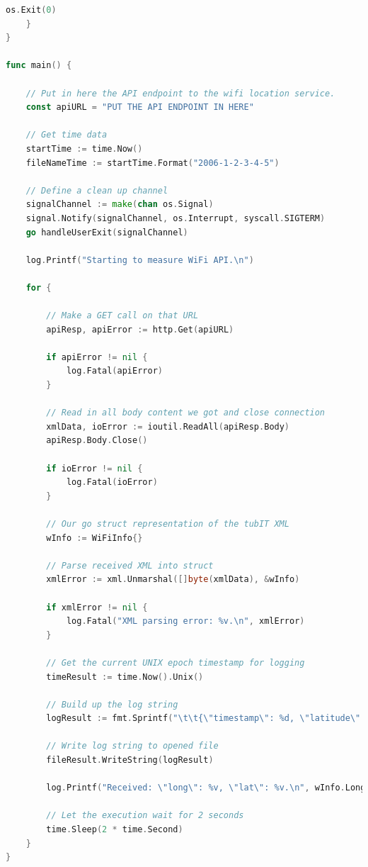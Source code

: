 \documentclass[twoside,11pt,titlepage,a4paper,english,bibliography=totocnumbered,listof=numbered]{scrbook}
\begin{document}
\begin{appendices}
\begin{lstlisting}[language=go]
        os.Exit(0)
    }
}

func main() {

    // Put in here the API endpoint to the wifi location service.
    const apiURL = "PUT THE API ENDPOINT IN HERE"

    // Get time data
    startTime := time.Now()
    fileNameTime := startTime.Format("2006-1-2-3-4-5")

    // Define a clean up channel
    signalChannel := make(chan os.Signal)
    signal.Notify(signalChannel, os.Interrupt, syscall.SIGTERM)
    go handleUserExit(signalChannel)

    log.Printf("Starting to measure WiFi API.\n")

    for {

        // Make a GET call on that URL
        apiResp, apiError := http.Get(apiURL)

        if apiError != nil {
            log.Fatal(apiError)
        }

        // Read in all body content we got and close connection
        xmlData, ioError := ioutil.ReadAll(apiResp.Body)
        apiResp.Body.Close()

        if ioError != nil {
            log.Fatal(ioError)
        }

        // Our go struct representation of the tubIT XML
        wInfo := WiFiInfo{}

        // Parse received XML into struct
        xmlError := xml.Unmarshal([]byte(xmlData), &wInfo)

        if xmlError != nil {
            log.Fatal("XML parsing error: %v.\n", xmlError)
        }

        // Get the current UNIX epoch timestamp for logging
        timeResult := time.Now().Unix()

        // Build up the log string
        logResult := fmt.Sprintf("\t\t{\"timestamp\": %d, \"latitude\": \"%.15f\", \"longitude\": \"%.15f\", \"building\": \"%s\", \"floor\": \"%s\"},\n", timeResult, wInfo.Latitude, wInfo.Longitude, wInfo.Building, wInfo.Floor)

        // Write log string to opened file
        fileResult.WriteString(logResult)

        log.Printf("Received: \"long\": %v, \"lat\": %v.\n", wInfo.Longitude, wInfo.Latitude)

        // Let the execution wait for 2 seconds
        time.Sleep(2 * time.Second)
    }
}
\end{lstlisting}

\end{appendices}
\end{document}
